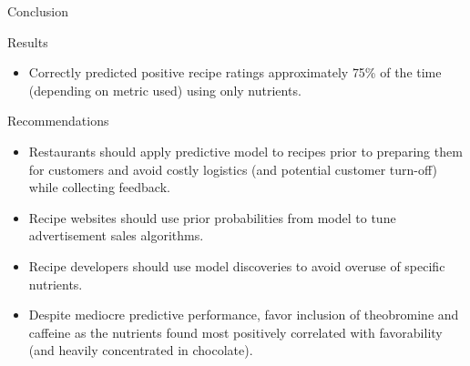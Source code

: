 \documentclass{beamer}
\begin{document}
\begin{frame}{Conclusion}
	
	\begin{block}{Results}
		\begin{itemize}
			\item Correctly predicted positive recipe ratings approximately \alert{75\%} of the time (depending on metric used) using \alert{only} nutrients.
			
		\end{itemize}		
	\end{block}	

	\begin{block}{Recommendations}
		\begin{itemize}
			\item Restaurants should apply predictive model to recipes prior to preparing them for customers and avoid costly logistics (and potential customer turn-off) while collecting feedback.
			\item Recipe websites should use prior probabilities from model to tune advertisement sales algorithms.
			\item Recipe developers should use model discoveries to avoid overuse of specific nutrients.
			\item Despite mediocre predictive performance, favor inclusion of theobromine and caffeine as the nutrients found most positively correlated with favorability (and heavily concentrated in chocolate).
		\end{itemize}		
	\end{block}	
			
\end{frame}

%
%	
%
\end{document}
